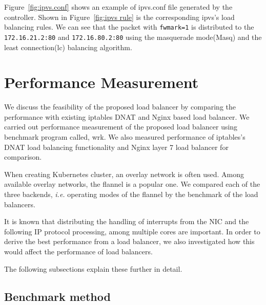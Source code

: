 Figure~\ref{fig:ipvs.conf} shows an example of ipvs.conf file generated by the controller. 
Shown in Figure~\ref{fig:ipvs rule} is the corresponding ipvs's load balancing rules.
We can see that the packet with {\tt fwmark=1}\cite{BertHubert2002} is distributed 
to the {\tt 172.16.21.2:80} and {\tt 172.16.80.2:80} 
using the masquerade mode(Masq)\cite{Zhang2000} and 
the least connection(lc)\cite{Zhang2000} balancing algorithm.   


\section{Performance Measurement}\label{Performance Measurement}

We discuss the feasibility of the proposed load balancer by comparing the performance with existing iptables DNAT and Nginx based load balancer. 
We carried out performance measurement of the proposed load balancer using benchmark program called, wrk\cite{Glozer2016}.
We also measured performance of iptables's DNAT load balancing functionality and Nginx layer 7 load balancer for comparison.

When creating Kubernetes cluster, an overlay network\cite{Sill2016,Marmol2015} is often used. 
Among available overlay networks, the flannel\cite{CoreOSFlannel} is a popular one.
We compared each of the three backends\cite{CoreOSFlannelBackend}, 
{\it i.e.} operating modes of the flannel by the benchmark of the load balancers.

It is known that distributing the handling of interrupts from the NIC 
and the following IP protocol processing, among multiple cores are important.
In order to derive the best performance from a load balancer, 
we also investigated how this would affect the performance of load balancers.

The following subsections explain these further in detail. 

\subsection{Benchmark method}

